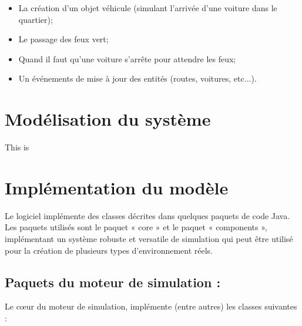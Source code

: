 \documentclass[12pt]{article} %
\begin{document}
\begin{itemize}
\item La création d'un objet véhicule (simulant l'arrivée d'une voiture dans le quartier); 

\item Le passage des feux vert; 

\item Quand il faut qu'une voiture s'arrête pour attendre les feux; 

\item Un événements de mise à jour des entités (routes, voitures, etc...).
\end{itemize}


\newpage
\section{Modélisation du système}\label{modelisation}
This is

\newpage
\section{Implémentation du modèle}\label{implementation}
Le logiciel implémente des classes décrites dans quelques paquets de code Java. Les paquets utilisés sont le paquet « core » et le paquet « components », implémentant un système robuste et versatile de simulation qui peut être utilisé pour la création de plusieurs types d’environnement réels.

\subsection{Paquets du moteur de simulation :}
Le cœur du moteur de simulation, implémente (entre autres) les classes suivantes :
\end{document}

